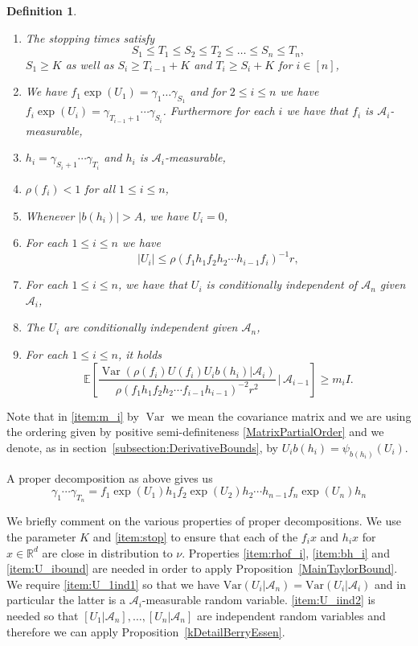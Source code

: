 \documentclass[10pt, english,oneside,reqno]{amsart}
\theoremstyle{plain}
\newtheorem{definition}[theorem]{Definition}
\theoremstyle{remark}
\numberwithin{equation}{section}
\numberwithin{figure}{section}
\DeclareMathOperator{\var}{Var}
\newcommand{\R}{\mathbb{R}}
\newcommand{\E}{\mathbb{E}}
\newcommand{\Var}{\mathrm{Var}}
\begin{document}
\begin{definition}
    \begin{enumerate}[label=\textbf{A\arabic*}]
        \item The stopping times satisfy $$S_1 \leq T_1 \leq  S_2 \leq T_2 \leq \ldots \leq S_n \leq T_n,$$ $S_1 \geq K$ as well as $S_i \geq T_{i-1} +K$ and $T_i \geq S_i + K$ for $i \in [n]$, \label{item:stop}
        \item We have $f_1 \exp(U_1) = \gamma_1 \dots \gamma_{S_1}$ and for $2 \leq i \leq n$ we have $f_i \exp(U_i) = \gamma_{T_{i-1} + 1} \cdots \gamma_{S_i}$. Furthermore for each $i$ we have that $f_i$ is $\mathscr{A}_i$-measurable, \label{item:f_idef}
        \item $h_i = \gamma_{S_i + 1} \cdots \gamma_{T_i}$ and $h_i$ is $\mathscr{A}_i$-measurable, \label{item:h_idef}
        \item $\rho(f_i) < 1$ for all $1 \leq i \leq n$, \label{item:rhof_i}
        \item Whenever $|b(h_i)| > A$, we have $U_i = 0$, \label{item:bh_i}
        \item For each $1 \leq i \leq n$ we have $$|U_i| \leq \rho(f_1 h_1 f_2 h_2 \cdots h_{i-1}f_{i})^{-1} r,$$ \label{item:U_ibound}
        \item For each $1 \leq i \leq n$,  we have that $U_i$ is conditionally independent of $\mathscr{A}_n$ given $\mathscr{A}_i$, \label{item:U_1ind1}
        \item The $U_i$ are conditionally independent given $\mathscr{A}_n$, \label{item:U_iind2}
        \item For each $1 \leq i \leq n$, it holds  $$\E\left[   \frac{\var(\rho(f_i) U(f_i) U_i b(h_i)|\mathscr{A}_i)}{\rho(f_1h_1 f_2h_2 \cdots f_{i-1}h_{i-1})^{-2} r^2} \,|\, \mathscr{A}_{i-1}  \right] \geq m_i I.$$ \label{item:m_i}
    \end{enumerate}
\end{definition}

Note that in \ref{item:m_i} by $\var$ we mean the covariance matrix and we are using the ordering given by positive semi-definiteness \eqref{MatrixPartialOrder} and we denote, as in section~\ref{subsection:DerivativeBounds}, by $U_ib(h_i) = \psi_{b(h_i)}(U_i)$.

A proper decomposition as above gives us 
\begin{equation}
    \gamma_1\cdots \gamma_{T_n} = f_1\exp(U_1)h_1f_2 \exp(U_2)h_2 \cdots h_{n-1}f_n\exp(U_n)h_n
\end{equation}

We briefly comment on the various properties of proper decompositions. We use the parameter $K$ and \ref{item:stop} to ensure that each of the $f_ix$ and $h_ix$ for $x \in \R^d$ are close in distribution to $\nu$. Properties \ref{item:rhof_i}, \ref{item:bh_i} and \ref{item:U_ibound} are needed in order to apply Proposition~\ref{MainTaylorBound}. We require \ref{item:U_1ind1} so that we have $\Var(U_i|\mathscr{A}_n) = \mathrm{Var}(U_i|\mathscr{A}_i)$ and in particular the latter is a $\mathscr{A}_i$-measurable random variable. \ref{item:U_iind2} is needed so that $[U_1|\mathscr{A}_n], \ldots ,[U_n|\mathscr{A}_n]$ are independent random variables and therefore we can apply Proposition~\ref{kDetailBerryEssen}.
\end{document}
